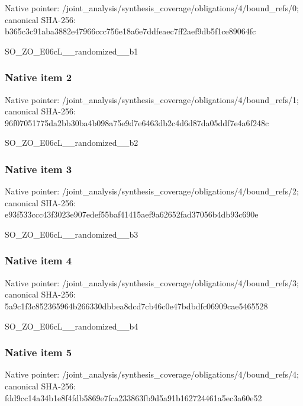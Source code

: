 \documentclass[10pt,a4paper]{article}
\begin{document}
Native pointer: /joint\_analysis/synthesi\allowbreak{}s\_coverage/obligations/4\allowbreak{}/bound\_refs/0; canonical SHA-256: b365c3c91aba3882e47966cc\allowbreak{}c756e18a6e7ddfeaec7ff2ae\allowbreak{}f9db5f1ce89064fc


SO\_ZO\_E06cL\_\_randomized\_\_b1


\subsubsection{Native item 2}


Native pointer: /joint\_analysis/synthesi\allowbreak{}s\_coverage/obligations/4\allowbreak{}/bound\_refs/1; canonical SHA-256: 96f07051775da2bb30ba4b09\allowbreak{}8a75e9d7e6463db2c4d6d87d\allowbreak{}a05ddf7e4a6f248c


SO\_ZO\_E06cL\_\_randomized\_\_b2


\subsubsection{Native item 3}


Native pointer: /joint\_analysis/synthesi\allowbreak{}s\_coverage/obligations/4\allowbreak{}/bound\_refs/2; canonical SHA-256: e93f533ccc43f3023e907ede\allowbreak{}f55baf41415aef9a62652fad\allowbreak{}37056b4db93c690e


SO\_ZO\_E06cL\_\_randomized\_\_b3


\subsubsection{Native item 4}


Native pointer: /joint\_analysis/synthesi\allowbreak{}s\_coverage/obligations/4\allowbreak{}/bound\_refs/3; canonical SHA-256: 5a9c1f3c852365964b266330\allowbreak{}dbbea8dcd7cb46c0e47bdbdf\allowbreak{}c06909cae5465528


SO\_ZO\_E06cL\_\_randomized\_\_b4


\subsubsection{Native item 5}


Native pointer: /joint\_analysis/synthesi\allowbreak{}s\_coverage/obligations/4\allowbreak{}/bound\_refs/4; canonical SHA-256: fdd9cc14a34b1e8f4fdb5869\allowbreak{}e7fca233863fb9d5a91b1627\allowbreak{}24461a5ec3a60e52
\end{document}
